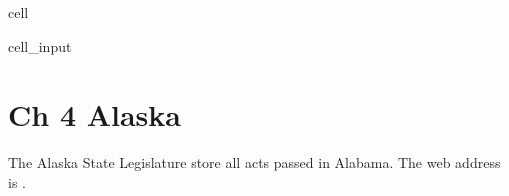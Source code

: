 \documentclass[letterpaper,10pt,english]{jupyterBook}
\begin{document}
\begin{sphinxuseclass}{cell}
\begin{sphinxVerbatimInput}
\begin{sphinxuseclass}{cell_input}
\begin{sphinxVerbatim}[commandchars=\\\{\}]
\end{sphinxVerbatim}

\end{sphinxuseclass}\end{sphinxVerbatimInput}

\end{sphinxuseclass}
\sphinxstepscope


\chapter{Ch 4 Alaska}
\label{\detokenize{ch4:ch-4-alaska}}\label{\detokenize{ch4::doc}}
\sphinxAtStartPar
The Alaska State Legislature store all acts passed in Alabama. The web address is .

\sphinxAtStartPar
{}
\end{document}

